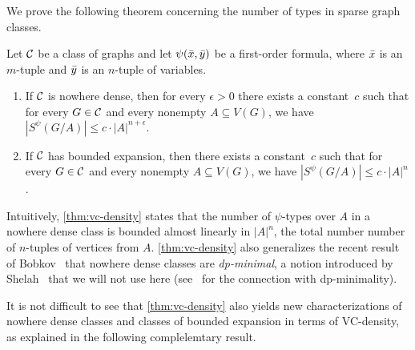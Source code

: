 We prove the following theorem concerning the number of
types in sparse graph classes.

\begin{theorem}\label{thm:vc-density}
Let $\mathcal{C}$ be a class of graphs and let $\psi(\bar{x},\bar{y})$ be a first-order formula, where 
$\bar{x}$ is an $m$-tuple and $\bar{y}$ is an $n$-tuple of variables. 
\begin{enumerate}
\item If $\mathcal{C}$ is nowhere dense, then for every $\epsilon>0$ 
there exists a constant~$c$ such that for every $G\in \mathcal{C}$ and every nonempty
$A\subseteq V(G)$, we have $|S^\psi(G/A)|\leq c\cdot |A|^{n+\epsilon}.$

\item If $\mathcal{C}$ has bounded expansion, then there exists a constant~$c$ such that for every $G\in \mathcal{C}$ and every nonempty $A\subseteq V(G)$, we have $|S^\psi(G/A)|\leq c\cdot |A|^n$.
\end{enumerate}
\end{theorem}

Intuitively, \cref{thm:vc-density} states that the number
of $\psi$-types over $A$ in a nowhere dense class 
is bounded almost linearly in $|A|^n$, the total number number of $n$-tuples of vertices from $A$. 
\cref{thm:vc-density} 
also generalizes the recent result of Bobkov~\cite{bobkov2017computations} that nowhere dense classes
are {\em{dp-minimal}}, a notion introduced by Shelah~\cite{shelah2014strongly} that we will not use here (see~\cite{dolich2011} for the connection
with dp-minimality).



%
%
%
%
%
%
It is not difficult to see that \cref{thm:vc-density} also yields new
characterizations of nowhere dense classes and classes of bounded expansion in terms of VC-density, as explained in the following complelemtary result.

